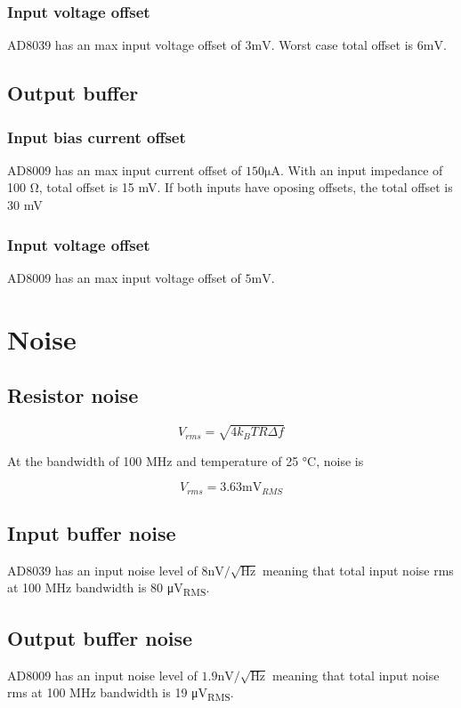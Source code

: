 \documentclass[11pt]{article}
\begin{document}
\subsubsection{Input voltage offset}
AD8039 has an max input voltage offset of $3 \si{\milli \volt}$.
Worst case total offset is $6 \si{\milli \volt}$.

\subsection{Output buffer}
\subsubsection{Input bias current offset}
AD8009 has an max input current offset of $150 \si{\micro \ampere}$. With an input impedance of 
100 \si{\ohm}, total offset is 15 mV. If both inputs have oposing offsets, the total offset is 30 mV

\subsubsection{Input voltage offset}
AD8009 has an max input voltage offset of $5 \si{\milli \volt}$.

\section{Noise}

\subsection{Resistor noise}


\begin{equation}
  V_{rms} = \sqrt{4 k_B T R \Delta f}
\end{equation}

At the bandwidth of 100 \si{\mega \hertz} and temperature of 25 \si{\celsius}, noise is

\begin{equation}
  V_{rms} = 3.63 \si{\milli \volt_{RMS}}
\end{equation}

\subsection{Input buffer noise}

AD8039 has an input noise level of $8 \si{\nano \volt} / \sqrt{\si{\hertz}}$ meaning 
that total input noise rms at 100 \si{\mega \hertz} bandwidth is 80 \si{\micro \volt_{RMS}}.

\subsection{Output buffer noise}
AD8009 has an input noise level of $1.9 \si{\nano \volt} / \sqrt{\si{\hertz}}$ meaning 
that total input noise rms at 100 \si{\mega \hertz} bandwidth is 19 \si{\micro \volt_{RMS}}.
\end{document}
